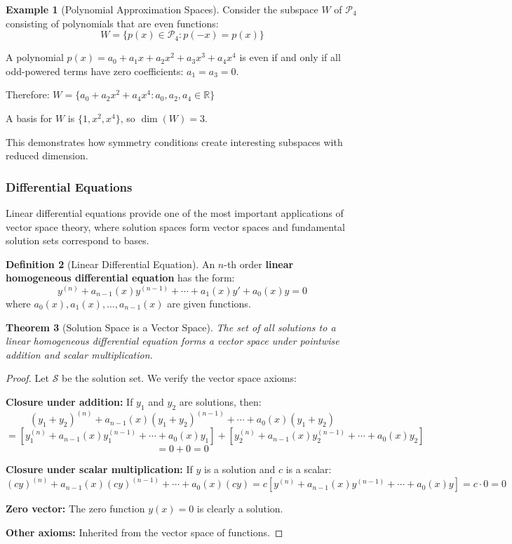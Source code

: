 \documentclass[12pt]{article}
\numberwithin{equation}{section}
\theoremstyle{plain}
\newtheorem{theorem}{Theorem}[section]
\theoremstyle{definition}
\newtheorem{definition}[theorem]{Definition}
\newtheorem{example}[theorem]{Example}
\theoremstyle{remark}
\begin{document}
\begin{example}[Polynomial Approximation Spaces]
Consider the subspace $W$ of $\mathcal{P}_4$ consisting of polynomials that are even functions:
$$W = \{p(x) \in \mathcal{P}_4 : p(-x) = p(x)\}$$

A polynomial $p(x) = a_0 + a_1x + a_2x^2 + a_3x^3 + a_4x^4$ is even if and only if all odd-powered terms have zero coefficients: $a_1 = a_3 = 0$.

Therefore: $W = \{a_0 + a_2x^2 + a_4x^4 : a_0, a_2, a_4 \in \mathbb{R}\}$

A basis for $W$ is $\{1, x^2, x^4\}$, so $\dim(W) = 3$.

This demonstrates how symmetry conditions create interesting subspaces with reduced dimension.
\end{example}

\subsubsection{Differential Equations}

Linear differential equations provide one of the most important applications of vector space theory, where solution spaces form vector spaces and fundamental solution sets correspond to bases.

\begin{definition}[Linear Differential Equation]
An $n$-th order \textbf{linear homogeneous differential equation} has the form:
$$y^{(n)} + a_{n-1}(x)y^{(n-1)} + \cdots + a_1(x)y' + a_0(x)y = 0$$
where $a_0(x), a_1(x), \ldots, a_{n-1}(x)$ are given functions.
\end{definition}

\begin{theorem}[Solution Space is a Vector Space]
The set of all solutions to a linear homogeneous differential equation forms a vector space under pointwise addition and scalar multiplication.
\end{theorem}

\begin{proof}
Let $\mathcal{S}$ be the solution set. We verify the vector space axioms:

\textbf{Closure under addition:} If $y_1$ and $y_2$ are solutions, then:
$$(y_1 + y_2)^{(n)} + a_{n-1}(x)(y_1 + y_2)^{(n-1)} + \cdots + a_0(x)(y_1 + y_2)$$
$$= [y_1^{(n)} + a_{n-1}(x)y_1^{(n-1)} + \cdots + a_0(x)y_1] + [y_2^{(n)} + a_{n-1}(x)y_2^{(n-1)} + \cdots + a_0(x)y_2]$$
$$= 0 + 0 = 0$$

\textbf{Closure under scalar multiplication:} If $y$ is a solution and $c$ is a scalar:
$$(cy)^{(n)} + a_{n-1}(x)(cy)^{(n-1)} + \cdots + a_0(x)(cy) = c[y^{(n)} + a_{n-1}(x)y^{(n-1)} + \cdots + a_0(x)y] = c \cdot 0 = 0$$

\textbf{Zero vector:} The zero function $y(x) = 0$ is clearly a solution.

\textbf{Other axioms:} Inherited from the vector space of functions.
\end{proof}
\end{document}
